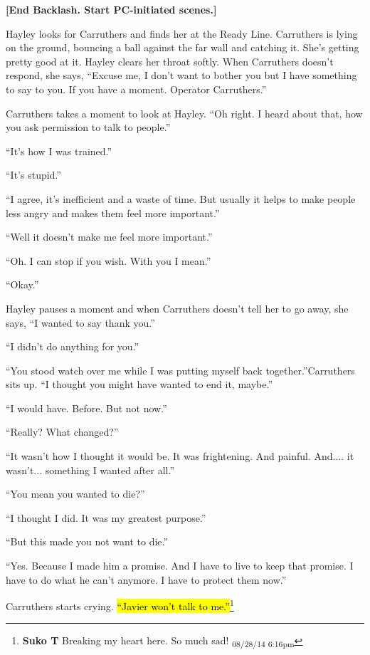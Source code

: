 \textbf{{[}End Backlash. Start PC-initiated scenes.{]}}



Hayley looks for Carruthers and finds her at the Ready Line.  Carruthers is lying on the ground, bouncing a ball against the far wall and catching it.  She's getting pretty good at it.  Hayley clears her throat softly.  When Carruthers doesn't respond, she says, ``Excuse me, I don't want to bother you but I have something to say to you. If you have a moment.  Operator Carruthers.''

Carruthers takes a moment to look at Hayley.  ``Oh right.  I heard about that, how you ask permission to talk to people.''

``It's how I was trained.''

``It's stupid.''

``I agree, it's inefficient and a waste of time.  But usually it helps to make people less angry and makes them feel more important.''

``Well it doesn't make me feel more important.''

``Oh.  I can stop if you wish.  With you I mean.''

``Okay.''  

Hayley pauses a moment and when Carruthers doesn't tell her to go away, she says, ``I wanted to say thank you.''

``I didn't do anything for you.''

``You stood watch over me while I was putting myself back together.''Carruthers sits up.  ``I thought you might have wanted to end it, maybe.''

``I would have.  Before.  But not now.''

``Really?  What changed?''

``It wasn't how I thought it would be.  It was frightening.  And painful.  And.... it wasn't... something I wanted after all.''

``You mean you wanted to die?''

``I thought I did.  It was my greatest purpose.''

``But this made you not want to die.''

``Yes.  Because I made him a promise.  And I have to live to keep that promise.  I have to do what he can't anymore.  I have to protect them now.''

Carruthers starts crying.  \hl{``Javier won't talk to me.''}\footnote{\textbf{Suko T }Breaking my heart here.  So much sad! \textsubscript{08/28/14 6:16pm}}

